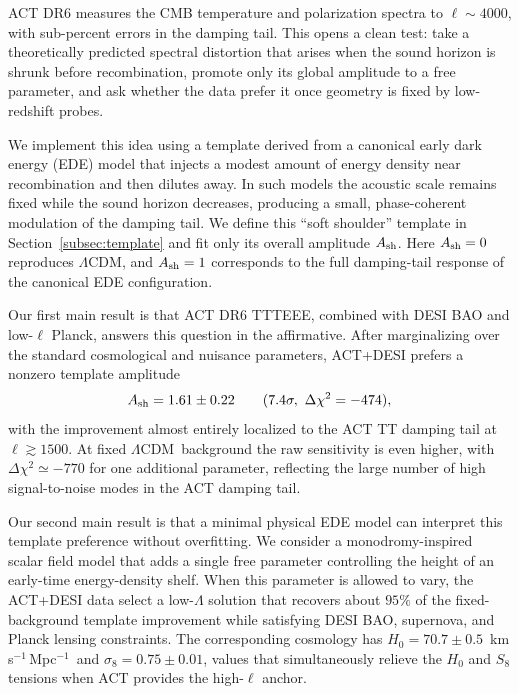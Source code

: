\documentclass[twocolumn,showpacs,preprintnumbers,amsmath,amssymb,prd]{revtex4-2}
\newcommand{\lcdm}{$\Lambda$CDM}
\newcommand{\kms}{km\,s$^{-1}$\,Mpc$^{-1}$}
\begin{document}
ACT DR6 measures the CMB temperature and polarization spectra to $\ell \sim 4000$, with sub-percent errors in the damping tail. This opens a clean test: take a theoretically predicted spectral distortion that arises when the sound horizon is shrunk before recombination, promote only its global amplitude to a free parameter, and ask whether the data prefer it once geometry is fixed by low-redshift probes.

We implement this idea using a template derived from a canonical early dark energy (EDE) model that injects a modest amount of energy density near recombination and then dilutes away. In such models the acoustic scale remains fixed while the sound horizon decreases, producing a small, phase-coherent modulation of the damping tail. We define this ``soft shoulder'' template in Section~\ref{subsec:template} and fit only its overall amplitude $A_{\rm sh}$. Here $A_{\rm sh} = 0$ reproduces \lcdm, and $A_{\rm sh} = 1$ corresponds to the full damping-tail response of the canonical EDE configuration.

Our first main result is that ACT DR6 TTTEEE, combined with DESI BAO and low-$\ell$ Planck, answers this question in the affirmative. After marginalizing over the standard cosmological and nuisance parameters, ACT+DESI prefers a nonzero template amplitude
\begin{equation}
A_{\rm sh} = 1.61 \pm 0.22 \qquad (7.4\sigma,\ \Delta\chi^2 = -474),
\end{equation}
with the improvement almost entirely localized to the ACT TT damping tail at $\ell \gtrsim 1500$. At fixed \lcdm\ background the raw sensitivity is even higher, with $\Delta\chi^2 \simeq -770$ for one additional parameter, reflecting the large number of high signal-to-noise modes in the ACT damping tail.

Our second main result is that a minimal physical EDE model can interpret this template preference without overfitting. We consider a monodromy-inspired scalar field model that adds a single free parameter controlling the height of an early-time energy-density shelf. When this parameter is allowed to vary, the ACT+DESI data select a low-$\Lambda$ solution that recovers about $95\%$ of the fixed-background template improvement while satisfying DESI BAO, supernova, and Planck lensing constraints. The corresponding cosmology has $H_0 = 70.7 \pm 0.5$~\kms\ and $\sigma_8 = 0.75 \pm 0.01$, values that simultaneously relieve the $H_0$ and $S_8$ tensions when ACT provides the high-$\ell$ anchor.
\end{document}
